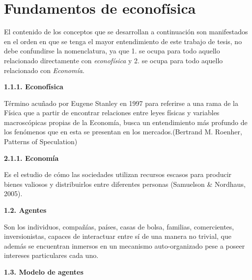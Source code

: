%
\chapter{Fundamentos de econofísica}
\label{sec:related}



{
    \noindent
    El contenido de los conceptos que se desarrollan a continuación son manifestados en el orden en que se tenga el mayor entendimiento de este trabajo de tesis, no debe confundirse la nomenclatura, ya que 1. se ocupa para todo aquello relacionado directamente con \textit{econofísica} y 2. se ocupa para todo aquello relacionado con \textit{Economía}.\newline
}

{
\noindent
\Large \textbf{1.1.1. Econofísica}
}

Término acuñado por Eugene Stanley en 1997 para referirse a una rama de la Física que a partir de encontrar relaciones entre leyes físicas y variables macroscópicas propias de la Economía, busca un entendimiento más profundo de los fenómenos que en esta se presentan en los mercados.(Bertrand M. Roenher, Patterns of Speculation)
\newline

{
\noindent
\Large  \textbf{2.1.1. Economía} 
}

Es el estudio de cómo las sociedades utilizan recursos escasos para producir bienes valiosos y distribuirlos entre diferentes personas (Samuelson \& Nordhaus, 2005).
\newline

{
\noindent
\Large  \textbf{1.2. Agentes} 
}

Son los individuos, compañías, países, casas de bolsa, familias, comercientes, inversionistas, capaces de interactuar entre sí de una manera no trivial, que además se encuentran inmersos en un mecanismo auto-organizado pese a poseer intereses particulares cada uno.
\newpage

{
\noindent
\Large  \textbf{1.3. Modelo de agentes} 
}

